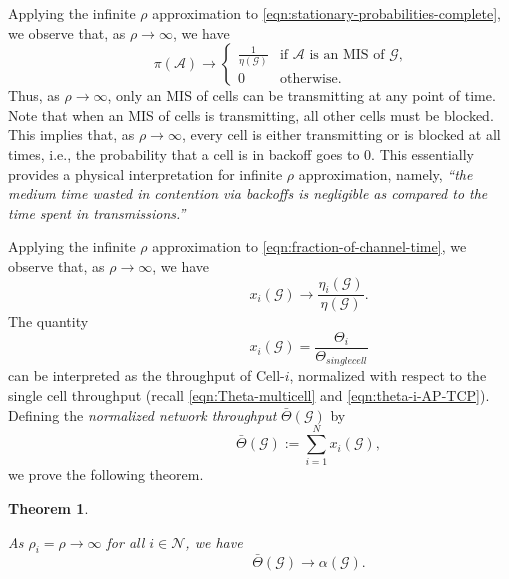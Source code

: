 \documentclass[10pt,a4paper,journal]{IEEEtran}
\theoremstyle{definition}
\theoremstyle{remark}
\theoremstyle{plain}
\newtheorem{theorem}{Theorem}[section]
\begin{document}
Applying the infinite $\rho$ approximation to \eqref{eqn:stationary-probabilities-complete}, we observe that, as $\rho \longrightarrow \infty$, we have 
\[\quad \quad \quad \pi(\mathcal{A}) \longrightarrow \left\{ \begin{array}{cl} \displaystyle \frac{1}{\eta(\mathcal{G})} & \mbox{if $\mathcal{A}$ is an MIS of $\mathcal{G}$,} \\ 0 & \mbox{otherwise}. \end{array} \right.\] 
Thus, as $\rho \longrightarrow \infty$, only an MIS of cells can be transmitting at any point of time. Note that when an MIS of cells is transmitting, all other cells must be blocked. This implies that, as $\rho \longrightarrow \infty$, every cell is either transmitting or is blocked at all times, i.e., the probability that a cell is in backoff goes to 0. This essentially provides a physical interpretation for infinite $\rho$ approximation, namely, \textit{``the medium time wasted in contention via backoffs is negligible as compared to the time spent in transmissions.''} 


Applying the infinite $\rho$ approximation to \eqref{eqn:fraction-of-channel-time}, we observe that, as $\rho \longrightarrow \infty$, we have 
\begin{equation}
\label{eqn:xi-infty}
\quad \quad \quad \quad \quad \quad \quad x_i(\mathcal{G}) \longrightarrow \frac{\eta_i(\mathcal{G})}{\eta(\mathcal{G})}.
\end{equation} 
The quantity 
\[\quad \quad \quad \quad \quad \quad \quad x_i(\mathcal{G}) = \frac{\Theta_i}{\Theta_{singlecell}}\] 
can be interpreted as the throughput of Cell-$i$, normalized with respect to the single cell throughput (recall \eqref{eqn:Theta-multicell} and \eqref{eqn:theta-i-AP-TCP}). Defining the \textit{normalized network throughput} $\bar{\Theta}(\mathcal{G})$ by 
\begin{equation}
\label{eqn:normalized-network-throughput}
\quad \quad \quad \quad \quad \quad \quad \bar{\Theta}(\mathcal{G}) := \sum_{i=1}^N x_i(\mathcal{G}),
\end{equation} 
we prove the following theorem.


\begin{theorem}
\label{thm:maximum-throughput}

As $\rho_i = \rho \longrightarrow \infty$ for all $i \in \mathcal{N}$, we have 
\[\quad \quad \quad \quad \quad \quad \quad \bar{\Theta}(\mathcal{G}) \longrightarrow \alpha(\mathcal{G}).\]

\end{theorem}
\end{document}
